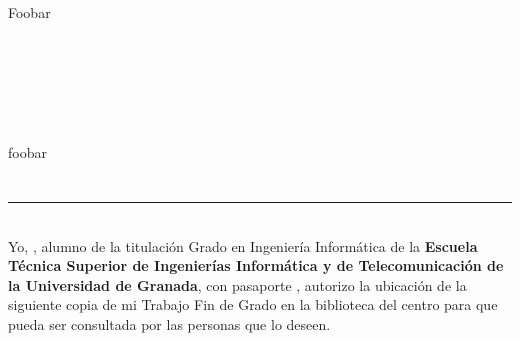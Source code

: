 \chapter*{}


%



\thispagestyle{empty}

\begin{center}
{\small \bfseries \myTitle}
\end{center}
\begin{center}
\myName
\end{center}



Foobar
\cleardoublepage


\thispagestyle{empty}


\begin{center}
{\large\bfseries \myTitleENG} \\
\end{center}
\begin{center}
\myName \\
\end{center}

\vspace{0.7cm}
 \\

\vspace{0.7cm}
 \\

foobar
\chapter*{}
\thispagestyle{empty}

\noindent\rule[-1ex]{\textwidth}{2pt}\\[4.5ex]

Yo, \textbf{\myName}, alumno de la titulación Grado en Ingeniería Informática de la \textbf{Escuela Técnica Superior
de Ingenierías Informática y de Telecomunicación de la Universidad de Granada}, con pasaporte \myDNI, autorizo la
ubicación de la siguiente copia de mi Trabajo Fin de Grado en la biblioteca del centro para que pueda ser
consultada por las personas que lo deseen.

